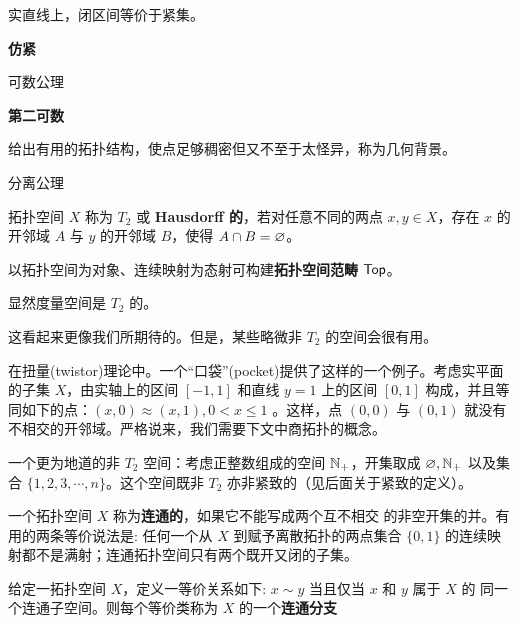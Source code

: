 \begin{eg}
    实直线上，闭区间等价于紧集。
\end{eg}

\begin{definition}
    \textbf{仿紧}
\end{definition}


可数公理

\begin{definition}
    \textbf{第二可数}
\end{definition}
给出有用的拓扑结构，使点足够稠密但又不至于太怪异，称为几何背景。

分离公理

\begin{definition}
    拓扑空间 $X$ 称为 $T_2$ 或 \textbf{Hausdorff 的}，若对任意不同的两点 $x,y \in X$，存在 $x$ 的开邻域 $A$ 与 $y$ 的开邻域 $B$，使得 $A \cap B=\varnothing$。
\end{definition}

以拓扑空间为对象、连续映射为态射可构建\textbf{拓扑空间范畴} $\mathsf{Top}$。

\begin{theorem}
    显然度量空间是 $T_2$ 的。
\end{theorem}

这看起来更像我们所期待的。但是，某些略微非 $T_2$ 的空间会很有用。
\begin{eg}
    在扭量(twistor)理论中。一个“口袋”(pocket)提供了这样的一个例子。考虑实平面的子集 $X$，由实轴上的区间 $[-1,1]$ 和直线 $y=1$ 上的区间 $[0,1]$ 构成，并且等同如下的点：$(x,0) \approx(x,1),0<x \leqslant 1$ 。这样，点 $(0,0)$ 与 $(0,1)$ 就没有不相交的开邻域。严格说来，我们需要下文中商拓扑的概念。
\end{eg}

\begin{eg}
    一个更为地道的非 $T_2$ 空间：考虑正整数组成的空间 $\mathbb{N}_+$，开集取成 $\varnothing,\mathbb{N}_+$ 以及集合 $\{1,2,3,\cdots,n\}$。这个空间既非 $T_2$ 亦非紧致的（见后面关于紧致的定义）。
\end{eg}

\begin{definition}
    一个拓扑空间 $X$ 称为\textbf{连通的}，如果它不能写成两个互不相交 的非空开集的并。有用的两条等价说法是: 任何一个从 $X$ 到赋予离散拓扑的两点集合 $\{0,1\}$ 的连续映射都不是满射；连通拓扑空间只有两个既开又闭的子集。

    给定一拓扑空间 $X$，定义一等价关系如下: $x \sim y$ 当且仅当 $x$ 和 $y$ 属于 $X$ 的 同一个连通子空间。则每个等价类称为 $X$ 的一个\textbf{连通分支}
\end{definition}

